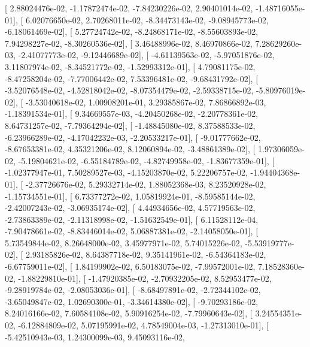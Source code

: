 \documentclass{article}
\begin{document}
       [  2.88024476e-02,  -1.17872474e-02,  -7.84230226e-02,
          2.90401014e-02,  -1.48716055e-01],
       [  6.02076650e-02,   2.70268011e-02,  -8.34473143e-02,
         -9.08945773e-02,  -6.18061469e-02],
       [  5.27724742e-02,  -8.24868171e-02,  -8.55603893e-02,
          7.94298227e-02,  -8.30260536e-02],
       [  3.46488996e-02,   8.46970866e-02,   7.28629260e-03,
         -2.41077773e-02,  -9.12446689e-02],
       [ -4.61139563e-02,  -5.97051876e-02,   3.11807974e-02,
         -8.34521772e-02,  -1.52993312e-01],
       [  4.79081175e-02,  -8.47258204e-02,  -7.77006442e-02,
          7.53396481e-02,  -9.68431792e-02],
       [ -3.52076548e-02,  -4.52818042e-02,  -8.07354479e-02,
         -2.59338715e-02,  -5.80976019e-02],
       [ -3.53040618e-02,   1.00908201e-01,   3.29385867e-02,
          7.86866892e-03,  -1.18391534e-01],
       [  9.34669557e-03,  -4.20450268e-02,  -2.20778361e-02,
          8.64731257e-02,  -7.79364294e-02],
       [ -1.48845080e-02,   8.37588533e-02,  -6.23966289e-02,
         -4.17042232e-03,  -2.20533217e-01],
       [ -9.01777662e-02,  -8.67653381e-02,   4.35321206e-02,
          8.12060894e-02,  -3.48861389e-02],
       [  1.97306059e-02,  -5.19804621e-02,  -6.55184789e-02,
         -4.82749958e-02,  -1.83677359e-01],
       [ -1.02377947e-01,   7.50289527e-03,  -4.15203870e-02,
          5.22206757e-02,  -1.94404368e-01],
       [ -2.37726676e-02,   5.29332714e-02,   1.88052368e-03,
          8.23520928e-02,  -1.15734551e-01],
       [  6.73377272e-02,   1.05819924e-01,  -8.59585144e-02,
         -2.42007243e-02,  -3.06935174e-02],
       [  4.44934656e-02,   4.57719563e-02,  -2.73863389e-02,
         -2.11318998e-02,  -1.51632549e-01],
       [  6.11528112e-04,  -7.90478661e-02,  -8.83446014e-02,
          5.06887381e-02,  -2.14058050e-01],
       [  5.73549844e-02,   8.26648000e-02,   3.45977971e-02,
          5.74015226e-02,  -5.53919777e-02],
       [  2.93185826e-02,   8.64387718e-02,   9.35141961e-02,
         -6.54364183e-02,  -6.67759011e-02],
       [  1.84199902e-02,   6.50183075e-02,  -7.99572001e-02,
          7.18528360e-02,  -1.88229810e-01],
       [ -1.47920385e-02,  -2.70932205e-02,   8.52953477e-02,
         -9.28919784e-02,  -2.08053036e-01],
       [ -8.68497891e-02,  -2.72344102e-02,  -3.65049847e-02,
          1.02690300e-01,  -3.34614380e-02],
       [ -9.70293186e-02,   8.24016166e-02,   7.60584108e-02,
          5.90916254e-02,  -7.79960643e-02],
       [  3.24554351e-02,  -6.12884809e-02,   5.07195991e-02,
          4.78549004e-03,  -1.27313010e-01],
       [ -5.42510943e-03,   1.24300099e-03,   9.45093116e-02,
\end{document}
